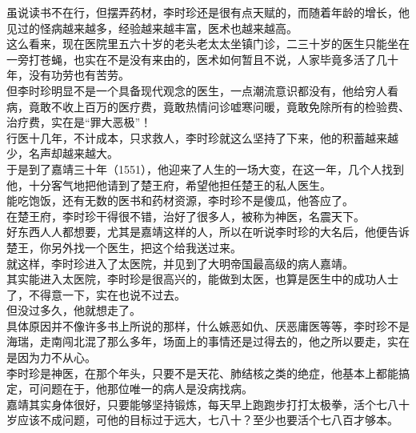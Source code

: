 \begin{multicols}{\theparacolNo}
虽说读书不在行，但摆弄药材，李时珍还是很有点天赋的，而随着年龄的增长，他见过的怪病越来越多，经验越来越丰富，医术也越来越高。\\

这么看来，现在医院里五六十岁的老头老太太坐镇门诊，二三十岁的医生只能坐在一旁打苍蝇，也实在不是没有来由的，医术如何暂且不说，人家毕竟多活了几十年，没有功劳也有苦劳。\\

但李时珍明显不是一个具备现代观念的医生，一点潮流意识都没有，他给穷人看病，竟敢不收上百万的医疗费，竟敢热情问诊嘘寒问暖，竟敢免除所有的检验费、治疗费，实在是“罪大恶极”！\\

行医十几年，不计成本，只求救人，李时珍就这么坚持了下来，他的积蓄越来越少，名声却越来越大。\\

于是到了嘉靖三十年（1551），他迎来了人生的一场大变，在这一年，几个人找到他，十分客气地把他请到了楚王府，希望他担任楚王的私人医生。\\

能吃饱饭，还有无数的医书和药材资源，李时珍不是傻瓜，他答应了。\\

在楚王府，李时珍干得很不错，治好了很多人，被称为神医，名震天下。\\

好东西人人都想要，尤其是嘉靖这样的人，所以在听说李时珍的大名后，他便告诉楚王，你另外找一个医生，把这个给我送过来。\\

就这样，李时珍进入了太医院，并见到了大明帝国最高级的病人嘉靖。\\

其实能进入太医院，李时珍是很高兴的，能做到太医，也算是医生中的成功人士了，不得意一下，实在也说不过去。\\

但没过多久，他就想走了。\\

具体原因并不像许多书上所说的那样，什么嫉恶如仇、厌恶庸医等等，李时珍不是海瑞，走南闯北混了那么多年，场面上的事情还是过得去的，他之所以要走，实在是因为力不从心。\\

李时珍是神医，在那个年头，只要不是天花、肺结核之类的绝症，他基本上都能搞定，可问题在于，他那位唯一的病人是没病找病。\\

嘉靖其实身体很好，只要能够坚持锻炼，每天早上跑跑步打打太极拳，活个七八十岁应该不成问题，可他的目标过于远大，七八十？至少也要活个七八百才够本。\\


\end{multicols}
